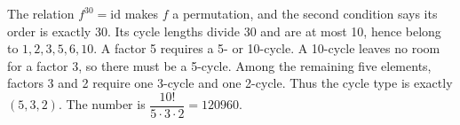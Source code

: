The relation $f^{30}=\mathrm{id}$ makes $f$ a permutation, and the second condition says its order is exactly 30. Its cycle lengths divide 30 and are at most 10, hence belong to $1,2,3,5,6,10$. A factor 5 requires a 5- or 10-cycle. A 10-cycle leaves no room for a factor 3, so there must be a 5-cycle. Among the remaining five elements, factors 3 and 2 require one 3-cycle and one 2-cycle. Thus the cycle type is exactly $(5,3,2)$. The number is $\dfrac{10!}{5\cdot3\cdot2}=\boxed{120960}$.
